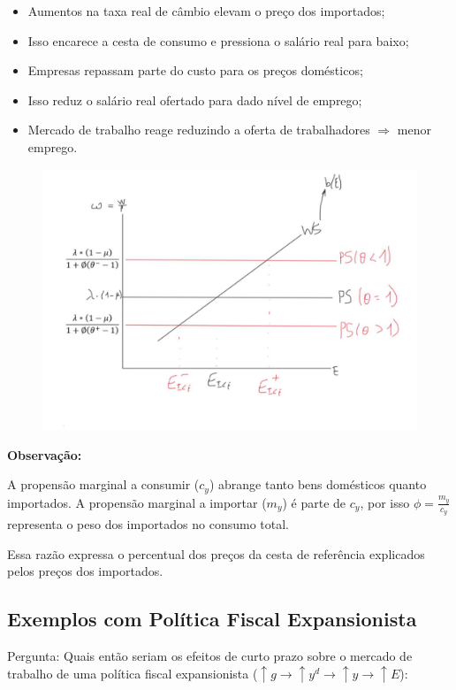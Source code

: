 \documentclass[a4paper,12pt]{article}[abntex2]
\begin{document}
\begin{itemize}
  \item Aumentos na taxa real de câmbio elevam o preço dos importados;
  \item Isso encarece a cesta de consumo e pressiona o salário real para baixo;
  \item Empresas repassam parte do custo para os preços domésticos;
  \item Isso reduz o salário real ofertado para dado nível de emprego;
  \item Mercado de trabalho reage reduzindo a oferta de trabalhadores $\Rightarrow$ menor emprego.
\end{itemize}

\begin{figure}[H]
    \centering
    \includegraphics[width=0.7\linewidth]{Imagens/a24i5.png}
\end{figure}

\textbf{Observação:}

A propensão marginal a consumir ($c_y$) abrange tanto bens domésticos quanto importados. A propensão marginal a importar ($m_y$) é parte de $c_y$, por isso $\phi = \frac{m_y}{c_y}$ representa o peso dos importados no consumo total.

Essa razão expressa o percentual dos preços da cesta de referência explicados pelos preços dos importados.

\subsection{\textbf{Exemplos com Política Fiscal Expansionista}}
Pergunta: Quais então seriam os efeitos de curto prazo sobre o mercado de trabalho de uma política fiscal expansionista (\(\uparrow g\rightarrow\uparrow y^d\rightarrow\uparrow y\rightarrow\uparrow E\)): 
\end{document}
